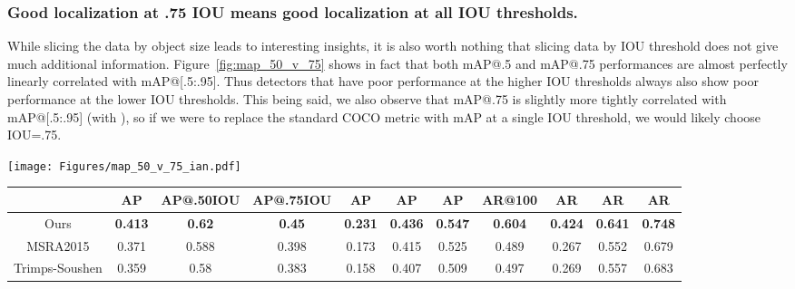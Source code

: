 \documentclass[10pt,twocolumn,letterpaper]{article}
\renewcommand{\paragraph}[1]{\subsubsection{#1}}
\begin{document}
\paragraph{Good localization at .75 IOU means good localization at all IOU thresholds.}

While slicing the data by object size leads to interesting insights,
it is also worth nothing that slicing data by IOU threshold does not
give much additional information.  Figure~\ref{fig:map_50_v_75} shows
in fact that both  mAP@.5 and mAP@.75 performances are almost
perfectly linearly correlated with mAP@[.5:.95].  Thus detectors that
have poor performance at the higher IOU thresholds always also show
poor performance at the lower IOU thresholds. 
This being said, we also observe that mAP@.75 is slightly more tightly
correlated with mAP@[.5:.95] (with ), so if we were to
replace the standard COCO metric with mAP at a single IOU threshold,
we would likely choose IOU=.75. 


\begin{figure*}
\begin{center}
\texttt{[image: Figures/map\_50\_v\_75\_ian.pdf]}
\end{center}\vspace{-4mm}
\caption{
\footnotesize Overall COCO mAP (@[.5:.95]) for all experiments plotted against
corresponding mAP@.50IOU and mAP@.75IOU.  It is unsurprising that these numbers
are correlated, but it is interesting that they are almost perfectly correlated so for these models, it is never the case that a model has strong 
performance at 50\% IOU but weak performance at 75\% IOU.
}
\label{fig:map_50_v_75}
\end{figure*}









\begin{table*}[t!]
\begin{center}
{\footnotesize
\begin{tabular}{c|c|c|c|c|c|c|c|c|c|c}
\, & AP & AP@.50IOU & AP@.75IOU & AP & AP & AP & AR@100 & AR & AR & AR \\
\hline
Ours & \bf 0.413 & \bf 0.62 & \bf 0.45 & \bf 0.231 & \bf 0.436 & \bf 0.547 & \bf 0.604 & \bf 0.424 & \bf 0.641 & \bf 0.748 \\
MSRA2015 & 0.371 & 0.588 & 0.398 & 0.173 & 0.415 & 0.525 & 0.489 & 0.267 & 0.552 & 0.679 \\
Trimps-Soushen & 0.359 & 0.58 & 0.383 & 0.158 & 0.407 & 0.509 & 0.497 & 0.269 & 0.557 & 0.683 \\
\end{tabular}\vspace{-4mm}
}
\end{center}
\caption{
\footnotesize Performance on the  2016 COCO test-challenge dataset.
AP and AR refer to (mean) average precision and average recall respectively.
Our model achieves a relative improvement of nearly 60\% on small objects recall over the previous state-of-the-art COCO detector.
}
\label{tab:cocoresults}
\end{table*}
\end{document}

